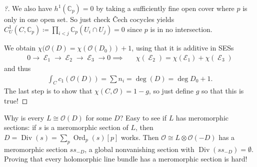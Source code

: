 \begin{proof}[?]
We also have \(h^1({\mathbb{C}}_p) = 0\) by taking a sufficiently fine
open cover where \(p\) is only in one open set. So just check Čech
cocycles yields
\(C_U^1(C, {\mathbb{C}}_p) \coloneqq\prod_{i<j} {\mathbb{C}}_p(U_i \cap U_j) = 0\)
since \(p\) is in no intersection.

\begin{figure}
\centering
{}
\end{figure}

We obtain \(\chi( {\mathcal{O}}(D) = \chi( {\mathcal{O}}(D_0) ) + 1\),
using that it is additive in SESs
\begin{align*}
0 \to 
\operatorname{\mathcal{E}}_1 \to
\operatorname{\mathcal{E}}_2 \to
\operatorname{\mathcal{E}}_3 \to
0
\implies && 
\chi(\operatorname{\mathcal{E}}_2) = \chi( \operatorname{\mathcal{E_1}}) + \chi( \operatorname{\mathcal{E}}_3 )
\end{align*}
and thus
\begin{align*}
\int_C c_1 ({\mathcal{O}}(D) ) = \sum n_i = \deg(D) = \deg D_0 + 1
.\end{align*}
The last step is to show that \(\chi(C, {\mathcal{O}}) = 1-g\), so just
define \(g\) so that this is true!

\end{proof}

\begin{remark}

Why is every \(L \cong {\mathcal{O}}(D)\) for some \(D\)? Easy to see if
\(L\) has meromorphic sections: if \(s\) is a meromorphic section of
\(L\), then
\(D = \operatorname{Div}(s) = \sum_p {\operatorname{Ord}}_p(s) [p]\)
works. Then \({\mathcal{O}}\cong L\otimes{\mathcal{O}}(-D)\) has a
meromorphic section \(s s_{-D}\), a global nonvanishing section with
\(\operatorname{Div}(s s_{-D} ) = \emptyset\). Proving that every
holomorphic line bundle has a meromorphic section is hard!

\end{remark}

\cleardoublepage

\renewcommand{\listtheoremname}{}
\listoftheorems[ignoreall,show={definition}, numwidth=3.5em]
\cleardoublepage

\renewcommand{\listtheoremname}{}
\listoftheorems[ignoreall,show={theorem,proposition}, numwidth=3.5em]
\cleardoublepage

\renewcommand{\listtheoremname}{}
\listoftheorems[ignoreall,show={exercise}, numwidth=3.5em]
\cleardoublepage

\listoffigures
\cleardoublepage


\printbibliography[title=Bibliography]



